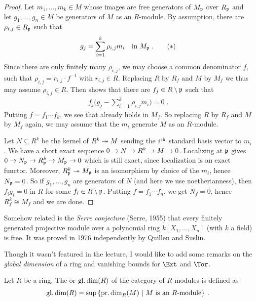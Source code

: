 \documentclass[a4paper,parskip=half,numbers=enddot, DIV=12]{scrreprt}
\begin{document}
\begin{proof}
	Let $m_1,\ldots,m_k\in M$ whose images are free generators of $M_{\mathfrak{p}}$ over $R_{\mathfrak{p}}$ and let $g_1,\ldots,g_n\in M$ be generators of $M$ as an $R$-module. By assumption, there are $\rho_{i,j}\in R_{\mathfrak{p}}$ such that
	\begin{align}\lbl{eq:gjInR_p}
		g_j=\sum_{i=1}^k\rho_{i,j}m_i\quad\text{in }M_\pp\;.\tag{$*$}
	\end{align}
	Since there are only finitely many $\rho_{i,j}$, we may choose a common denominator $f$, such that $\rho_{i,j}=r_{i,j}\cdot f^{-1}$ with $r_{i,j}\in R$. Replacing $R$ by $R_f$ and $M$ by $M_f$ we thus may assume $\rho_{i,j}\in R$. Then  shows that there are $f_j\in R\setminus \mathfrak{p}$ such that
	\begin{align*}
		f_j\bigg(g_j-\sum_{i=1}^k\rho_{i,j}m_i\bigg)=0\;.
	\end{align*}
	Putting $f=f_1\cdots f_k$, we see that  already holds in $M_f$. So replacing $R$ by $R_f$ and $M$ by $M_f$ again, we may assume that the $m_i$ generate $M$ as an $R$-module.
	
	Let $N\subseteq R^k$ be the kernel of $R^k\epimorphism M$ sending the $i^{\text{th}}$ standard basis vector to $m_i$. We have a short exact sequence $0\morphism N\morphism R^k\morphism M\morphism 0$. Localizing at $\mathfrak{p}$ gives $0\morphism N_\pp\morphism R_\pp^k\morphism M_\pp\morphism 0$ which is still exact, since localization is an exact functor. Moreover, $R_\pp^k\epimorphism M_\pp$ is an isomorphism by choice of the $m_i$, hence $N_{\mathfrak{p}}=0$. So if $g_1,\ldots,g_n$ are generators of $N$ (and here we use noetherianness), then $f_ig_i=0$ in $R$ for some $f_i\in R\setminus \mathfrak{p}$. Putting $f=f_1\cdots f_n$, we get $N_f=0$, hence $R_f^k\cong M_f$ and we are done.
\end{proof}
\begin{rem*}
	Somehow related is the \emph{Serre conjecture} (Serre, 1955) that every finitely generated projective module over a polynomial ring $k[X_1,\ldots,X_n]$ (with $k$ a field) is free. It was proved in 1976 independently by Quillen and Suslin.
\end{rem*}
Though it wasn't featured in the lecture, I would like to add some remarks on the \emph{global dimension} of a ring and vanishing bounds for $\Ext$ and $\Tor$.
\begin{defi}
	Let $R$ be a ring. The  or  $\operatorname{gl.dim}(R)$ of the category of $R$-modules is defined as
	\begin{align*}
	\operatorname{gl.dim}(R)=\sup\left\{\operatorname{pr.dim}_R(M)\ \middle|\  M\text{ is an }R\text{-module}\right\}\;.
	\end{align*}
\end{defi}
\end{document}
